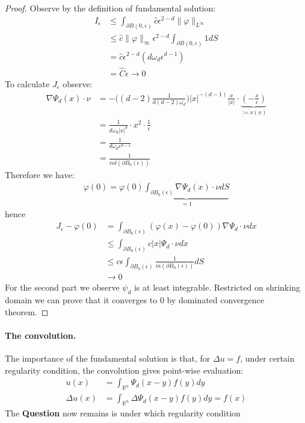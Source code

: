 \begin{proof}
	Observe by the definition of fundamental solution:
	\begin{align*}
		I_\epsilon &\le  \int_{\partial B(0, \epsilon)} \hat{c} \epsilon^{2 - d} \|\varphi\|_{L^\infty}  \\
		&\leq \hat{c} \|\varphi\|_\infty \epsilon^{2-d} \int_{\partial B(0, \epsilon)} 1 dS\\
		&= \hat{c} \epsilon^{2 - d} (d \omega_{d} \epsilon^{d - 1})\\
		&= \hat{C} \epsilon \rightarrow 0
	\end{align*}
To calculate $J_\epsilon$ observe:
	\begin{align*}
		\nabla \Psi_d(x) \cdot \nu &= -\bigg( (d-2) \frac{1}{d(d-2)\omega_d} \bigg) |x|^{-(d-1)}  \frac{x}{|x|} \cdot \underbrace{ (-\frac{x}{\epsilon}) }_{:= \nu(x)}\\
		&= \frac{1}{d\omega_d |x|^d} \cdot x^2 \cdot \frac{1}{\epsilon}\\
		&= \frac{1}{d\omega_d \epsilon^{d - 1} }\\
		&= \frac{1}{vol(\partial B_0(\epsilon))}
	\end{align*}
	Therefore we have:
	\begin{align*}
		\varphi(0) = \varphi(0) \underbrace{ \int_{\partial B_0(\epsilon)} \nabla \Psi_d(x) \cdot \nu dS}_{ = 1}
	\end{align*}
	hence
	\begin{align*}
		J_\epsilon - \varphi(0) &= \int_{\partial B_0(\epsilon)} (\varphi(x) - \varphi(0)) \nabla \Psi_d \cdot \nu dx\\
		&\leq \int_{\partial B_0(\epsilon)} c |x|\Psi_d \cdot \nu dx\\
		&\leq c\epsilon \int_{\partial B_0(\epsilon)} \frac{1}{m(\partial B_0(\epsilon))}d S\\
		&\rightarrow 0
	\end{align*}
	For the second part we observe $\psi_d$ is at least integrable. Restricted on shrinking domain we can prove that it converges to 0 by dominated convergence theorem. 
\end{proof} 

\paragraph{The convolution.}
The importance of the fundamental solution is that, for $\Delta u = f$, under certain regularity condition, the convolution gives point-wise evaluation:
\begin{align*}
	u(x) &= \int_{\mathbb{R}^n} \Psi_d(x - y) f(y) dy\\
	\Delta u(x) &= \int_{\mathbb{R}^n} \Delta \Psi_d (x - y) f(y) dy = f(x)
\end{align*}
The \textbf{Question} now remains is under which regularity condition

